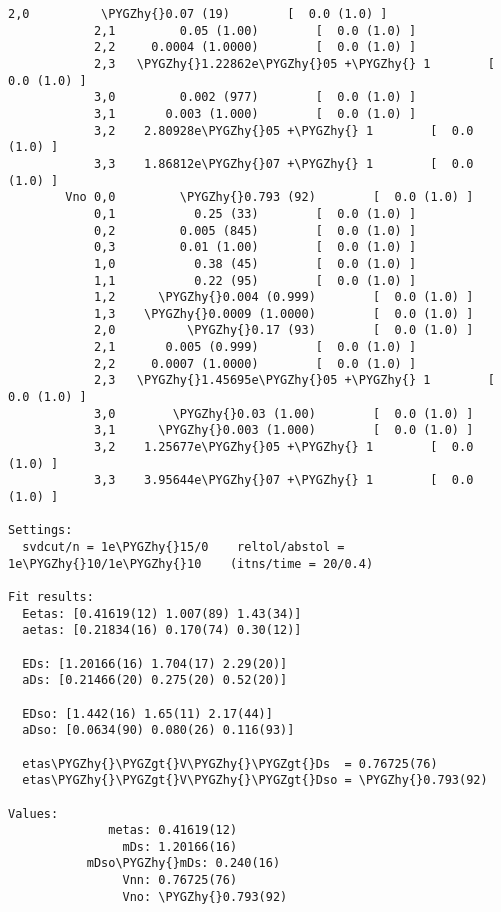 \documentclass[letterpaper,10pt,english]{sphinxmanual}
\def\PYGZgt{\char`\>}
\def\PYGZhy{\char`\-}
\begin{document}
\begin{Verbatim}[commandchars=\\\{\}]
            2,0          \PYGZhy{}0.07 (19)        [  0.0 (1.0) ]  
            2,1         0.05 (1.00)        [  0.0 (1.0) ]  
            2,2     0.0004 (1.0000)        [  0.0 (1.0) ]  
            2,3   \PYGZhy{}1.22862e\PYGZhy{}05 +\PYGZhy{} 1        [  0.0 (1.0) ]  
            3,0         0.002 (977)        [  0.0 (1.0) ]  
            3,1       0.003 (1.000)        [  0.0 (1.0) ]  
            3,2    2.80928e\PYGZhy{}05 +\PYGZhy{} 1        [  0.0 (1.0) ]  
            3,3    1.86812e\PYGZhy{}07 +\PYGZhy{} 1        [  0.0 (1.0) ]  
        Vno 0,0         \PYGZhy{}0.793 (92)        [  0.0 (1.0) ]  
            0,1           0.25 (33)        [  0.0 (1.0) ]  
            0,2         0.005 (845)        [  0.0 (1.0) ]  
            0,3         0.01 (1.00)        [  0.0 (1.0) ]  
            1,0           0.38 (45)        [  0.0 (1.0) ]  
            1,1           0.22 (95)        [  0.0 (1.0) ]  
            1,2      \PYGZhy{}0.004 (0.999)        [  0.0 (1.0) ]  
            1,3    \PYGZhy{}0.0009 (1.0000)        [  0.0 (1.0) ]  
            2,0          \PYGZhy{}0.17 (93)        [  0.0 (1.0) ]  
            2,1       0.005 (0.999)        [  0.0 (1.0) ]  
            2,2     0.0007 (1.0000)        [  0.0 (1.0) ]  
            2,3   \PYGZhy{}1.45695e\PYGZhy{}05 +\PYGZhy{} 1        [  0.0 (1.0) ]  
            3,0        \PYGZhy{}0.03 (1.00)        [  0.0 (1.0) ]  
            3,1      \PYGZhy{}0.003 (1.000)        [  0.0 (1.0) ]  
            3,2    1.25677e\PYGZhy{}05 +\PYGZhy{} 1        [  0.0 (1.0) ]  
            3,3    3.95644e\PYGZhy{}07 +\PYGZhy{} 1        [  0.0 (1.0) ]  

Settings:
  svdcut/n = 1e\PYGZhy{}15/0    reltol/abstol = 1e\PYGZhy{}10/1e\PYGZhy{}10    (itns/time = 20/0.4)

Fit results:
  Eetas: [0.41619(12) 1.007(89) 1.43(34)]
  aetas: [0.21834(16) 0.170(74) 0.30(12)]

  EDs: [1.20166(16) 1.704(17) 2.29(20)]
  aDs: [0.21466(20) 0.275(20) 0.52(20)]

  EDso: [1.442(16) 1.65(11) 2.17(44)]
  aDso: [0.0634(90) 0.080(26) 0.116(93)]

  etas\PYGZhy{}\PYGZgt{}V\PYGZhy{}\PYGZgt{}Ds  = 0.76725(76)
  etas\PYGZhy{}\PYGZgt{}V\PYGZhy{}\PYGZgt{}Dso = \PYGZhy{}0.793(92)

Values:
              metas: 0.41619(12)         
                mDs: 1.20166(16)         
           mDso\PYGZhy{}mDs: 0.240(16)           
                Vnn: 0.76725(76)         
                Vno: \PYGZhy{}0.793(92)          


\end{Verbatim}
\end{document}
